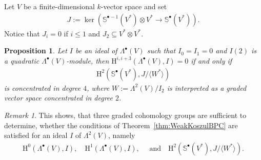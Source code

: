 \documentclass{amsart}
\newtheorem{prop}[thm]{Proposition}
\theoremstyle{definition}
\theoremstyle{remark}
\newtheorem{rem}[thm]{Remark}
\newcommand{\rmH}{\mathrm{H}}
\numberwithin{equation}{section}
\begin{document}
Let $V$ be a finite-dimensional $k$-vector space and set
\begin{align*}
    J:=\ker (\mathbb{S}^{\bullet-1}(V^*)\otimes V^*\to \mathbb{S}^{\bullet}(V^*)).
\end{align*}
Notice that $J_i=0$ if $i\leq 1$ and $J_2\subseteq V^\ast\otimes V^*$.
\begin{prop}
\label{prop:ThreeCohomologyGroupsAreEnough}
    Let $I$ be an ideal of $\Lambda^\bullet(V)$ such that $I_0=I_1=0$ and $I(2)$ is a quadratic $\Lambda^\bullet(V)$-module, then $\rmH^{i,i+3}(\Lambda^\bullet(V),I)=0$ if and only if
    \begin{align*}
        \rmH^{2}(\mathbb{S}^\bullet(V^*),J/\langle W^*\rangle)
    \end{align*}
    is concentrated in degree $4$, where $W:=\Lambda^2(V)/I_2$ is interpreted as a graded vector space concentrated in degree $2$. 
\end{prop}
\begin{rem}
    This shows, that three graded cohomology groups are sufficient to determine, whether the conditions of Theorem~\ref{thm:WeakKoszulBPC} are satisfied for an ideal $I$ of $\Lambda^2(V)$, namely
    \begin{align*}
        \rmH^0(\Lambda^\bullet(V),I),\quad \rmH^1(\Lambda^\bullet(V),I),\quad\text{ and}\quad \rmH^2(\mathbb{S}^\bullet(V^*),J/\langle W^*\rangle).
    \end{align*}
\end{rem}
\end{document}
